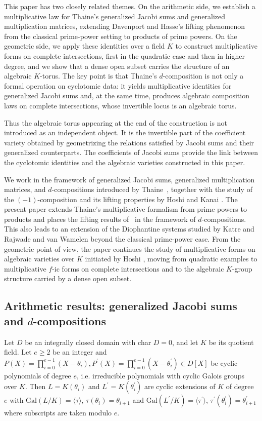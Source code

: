 \documentclass[a4paper, 11pt]{amsart}
\newcommand{\Gal}{\mathrm{Gal}}
\theoremstyle{plain}
\theoremstyle{definition}
\numberwithin{equation}{section}
\begin{document}
This paper has two closely related themes. 
On the arithmetic side, we establish a multiplicative law for Thaine's generalized Jacobi sums and generalized multiplication matrices, extending Davenport and Hasse's lifting phenomenon from the classical prime-power setting to products of prime powers. 
On the geometric side, we apply these identities over a field $K$ to construct multiplicative forms on complete intersections, 
first in the quadratic case and then in higher degree, and we show that a dense open subset carries the structure of an algebraic $K$-torus.
The key point is that Thaine's $d$-composition is not only a formal operation on cyclotomic data:
it yields multiplicative identities for generalized Jacobi sums and, at the same time, produces
algebraic composition laws on complete intersections, whose invertible locus is an algebraic torus.

Thus the algebraic torus appearing at the end of the construction is not introduced as an independent object. 
It is the invertible part of the coefficient variety obtained by geometrizing the relations satisfied by Jacobi sums and their generalized counterparts.
The coefficients of Jacobi sums provide the link between the cyclotomic identities
and the algebraic varieties constructed in this paper.

We work in the framework of generalized Jacobi sums, generalized multiplication matrices,
and $d$-compositions introduced by Thaine~\cite{Tha04}, together with the study of the $(-1)$-composition and its lifting properties by Hoshi and Kanai \cite{HK22}. 
The present paper extends Thaine's multiplicative formalism from prime powers to products and places the lifting results of~\cite{HK22} in the framework of $d$-compositions.
This also leads to an extension of the Diophantine systems studied by Katre and Rajwade \cite{KR85a} and van Wamelen \cite{Wam02} beyond the classical prime-power case. 
From the geometric point of view, the paper continues the study of multiplicative forms on algebraic varieties over $K$ initiated by Hoshi \cite{Hos03}, moving from quadratic examples to multiplicative $f$-ic forms on complete intersections and to the algebraic $K$-group structure carried by a dense open subset.

\subsection{Arithmetic results: generalized Jacobi sums and $d$-compositions}\label{S1-1}

Let $D$ be an integrally closed  domain with char $D=0$, and let $K$ be its quotient field. 
Let $e \geq 2$ be an integer and 
$P(X)=\prod_{i=0}^{e-1}(X-\theta_i), 
P^{\prime}(X)=\prod_{i=0}^{e-1}(X-\theta^{\prime}_i) \in D[X]$ 
be cyclic polynomials of degree $e$, 
i.e. irreducible polynomials with cyclic Galois groups over $K$. 
Then $L=K(\theta_i)$ and $L^{\prime}=K(\theta^{\prime}_i)$ 
are cyclic extensions of $K$ of degree $e$ with 
$\Gal(L/K)=\langle\tau\rangle$, 
$\tau(\theta_i)=\theta_{i+1}$ 
and 
$\Gal(L^{\prime}/K)=\langle\tau^{\prime}\rangle$, 
$\tau^{\prime}(\theta^{\prime}_i)=\theta^{\prime}_{i+1}$ 
where subscripts are taken modulo $e$. 
\end{document}
